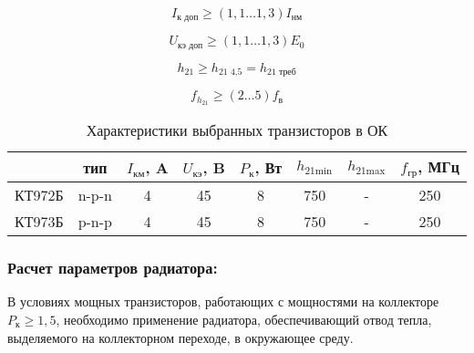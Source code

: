 \begin{equation}
\label{eq:equation2_8}
 I_{\text{к доп}}  \geq (1,1 \ldots 1,3) I_{\text{нм}}
\end{equation}
\begin{equation*}
 
\end{equation*}

\begin{equation}
\label{eq:equation2_9}
 U_{\text{кэ доп}}  \geq (1,1 \ldots 1,3) E_{\text{0}}
\end{equation}
\begin{equation*}
 
\end{equation*}

\begin{equation}
\label{eq:equation2_10}
 h_{21}  \geq h_{\text{21 4,5}} = h_{\text{21 треб}}
\end{equation}
\begin{equation*}
 
\end{equation*}

\begin{equation}
\label{eq:equation2_11}
 f_{h_{21}}  \geq (2 \ldots 5) f_{\text{в}}
\end{equation}
\begin{equation*}
 
\end{equation*}

\begin{table}[htbp]
\caption{Характеристики выбранных транзисторов в ОК}
\begin{center}\begin{tabular}{|c|c|c|c|c|c|c|c|}
\hline 
  & тип & $I_{\text{км}}$, A & $U_{\text{кэ}}$, B & $P_{\text{к}}$, Вт & $h_{\text{21min}}$ & $h_{\text{21max}}$ & $f_{\text{гр}}$, МГц \\ 
\hline 
КТ972Б & n-p-n & 4 & 45 & 8 & 750 & - & 250 \\ 
\hline 
КТ973Б & p-n-p & 4 & 45 & 8 & 750 & - & 250 \\ 
\hline 
\end{tabular} 
\end{center}
\end{table}

\subsubsection{Расчет параметров радиатора:}

В условиях мощных транзисторов, работающих с мощностями на коллекторе $P_{\text{к}} \geq 1,5$, необходимо применение радиатора, обеспечивающий отвод тепла, выделяемого на коллекторном переходе, в окружающее среду.

